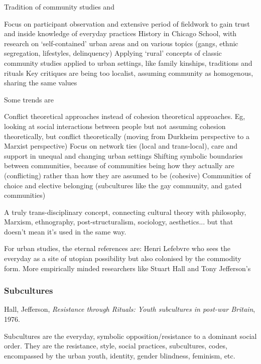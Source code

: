 \documentclass{article}
\begin{document}
Tradition of community studies and
\begin{outline}
	\1 Focus on participant observation and extensive period of fieldwork to gain trust and inside knowledge of everyday practices
	\1 History in Chicago School, with research on `self-contained' urban areas and on various topics (gangs, ethnic segregation, lifestyles, delinquency)
	\1 Applying `rural' concepts of classic community studies applied to urban settings, like family kinships, traditions and rituals
	\1 Key critiques are being too localist, assuming community as homogenous, sharing the same values
\end{outline}

Some trends are

\begin{outline}
	\1 Conflict theoretical approaches instead of cohesion theoretical approaches. Eg, looking at social interactions between people but not assuming cohesion theoretically, but conflict theoretically (moving from Durkheim perspective to a Marxist perspective)
	\1 Focus on network ties (local and trans-local), care and support in unequal and changing urban settings
	\1 Shifting symbolic boundaries between communities, because of communities being how they actually are (conflicting) rather than how they are assumed to be (cohesive)
	\1 Communities of choice and elective belonging (subcultures like the gay community, and gated communities)
\end{outline}

A truly trans-disciplinary concept, connecting cultural theory with philosophy, Marxism, ethnography, post-structuralism, sociology, aesthetics... but that doesn't mean it's used in the same way.

For urban studies, the eternal references are: Henri Lefebvre who sees the everyday as a site of utopian possibility but also colonised by the commodity form. More empirically minded researchers like Stuart Hall and Tony Jefferson's 

\subsubsection{Subcultures}

Hall, Jefferson, \textit{Resistance through Rituals: Youth subcultures in post-war Britain}, 1976. 

Subcultures are the everyday, symbolic opposition/resistance to a dominant social order. They are the resistance, style, social practices, subcultures, codes, encompassed by the urban youth, identity, gender blindness, feminism, etc.
\end{document}
